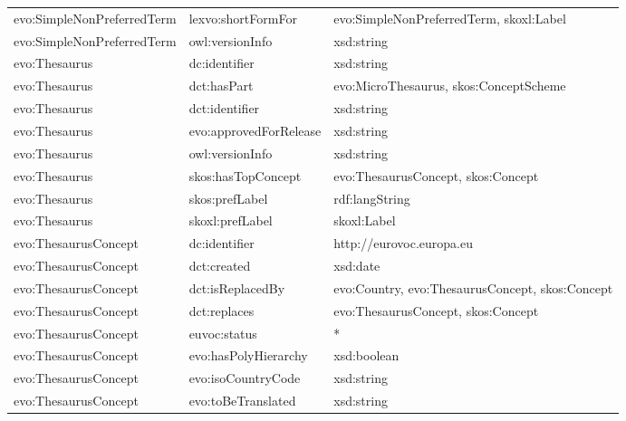 \documentclass[10pt,a4paper,titlepage,final]{article}
\begin{document}
\begin{tabularx}{\textwidth}{llX}
 evo:SimpleNonPreferredTerm &      lexvo:shortFormFor &            evo:SimpleNonPreferredTerm, skoxl:Label \\
 evo:SimpleNonPreferredTerm &         owl:versionInfo &                                         xsd:string \\
              evo:Thesaurus &           dc:identifier &                                         xsd:string \\
              evo:Thesaurus &             dct:hasPart &             evo:MicroThesaurus, skos:ConceptScheme \\
              evo:Thesaurus &          dct:identifier &                                         xsd:string \\
              evo:Thesaurus &  evo:approvedForRelease &                                         xsd:string \\
              evo:Thesaurus &         owl:versionInfo &                                         xsd:string \\
              evo:Thesaurus &      skos:hasTopConcept &                 evo:ThesaurusConcept, skos:Concept \\
              evo:Thesaurus &          skos:prefLabel &                                     rdf:langString \\
              evo:Thesaurus &         skoxl:prefLabel &                                        skoxl:Label \\
       evo:ThesaurusConcept &           dc:identifier &                           http://eurovoc.europa.eu \\
       evo:ThesaurusConcept &             dct:created &                                           xsd:date \\
       evo:ThesaurusConcept &        dct:isReplacedBy &    evo:Country, evo:ThesaurusConcept, skos:Concept \\
       evo:ThesaurusConcept &            dct:replaces &                 evo:ThesaurusConcept, skos:Concept \\
       evo:ThesaurusConcept &            euvoc:status &                                                  * \\
       evo:ThesaurusConcept &    evo:hasPolyHierarchy &                                        xsd:boolean \\
       evo:ThesaurusConcept &      evo:isoCountryCode &                                         xsd:string \\
       evo:ThesaurusConcept &      evo:toBeTranslated &                                         xsd:string \\

\end{tabularx}
\end{document}
